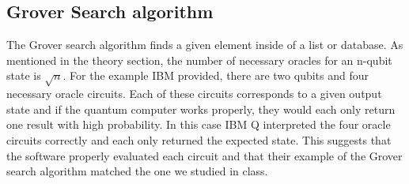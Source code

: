 \documentclass[12pt]{article}
\begin{document}
    \subsection{Grover Search algorithm}
        The Grover search algorithm finds a given element inside of a list or database. As mentioned in the theory section, the number of necessary oracles for an n-qubit state is $\sqrt{n}$. For the example IBM provided, there are two qubits and four necessary oracle circuits. Each of these circuits corresponds to a given output state and if the quantum computer works properly, they would each only return one result with high probability. In this case IBM Q interpreted the four oracle circuits correctly and each only returned the expected state. This suggests that the software properly evaluated each circuit and that their example of the Grover search algorithm matched the one we studied in class.
\end{document}

